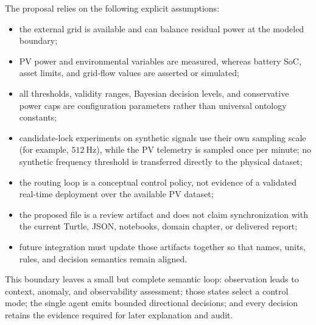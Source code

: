 \documentclass[
	letterpaper,
	10pt,
	unnumberedsections,
	twoside,
]{LTJournalArticle}
\begin{document}
The proposal relies on the following explicit assumptions:
\begin{itemize}
	\item the external grid is available and can balance residual power at the modeled boundary;
	\item PV power and environmental variables are measured, whereas battery SoC, asset limits, and grid-flow values are asserted or simulated;
	\item all thresholds, validity ranges, Bayesian decision levels, and conservative power caps are configuration parameters rather than universal ontology constants;
	\item candidate-lock experiments on synthetic signals use their own sampling scale (for example, $512\ \mathrm{Hz}$), while the PV telemetry is sampled once per minute; no synthetic frequency threshold is transferred directly to the physical dataset;
	\item the routing loop is a conceptual control policy, not evidence of a validated real-time deployment over the available PV dataset;
	\item the proposed file is a review artifact and does not claim synchronization with the current Turtle, JSON, notebooks, domain chapter, or delivered report;
	\item future integration must update those artifacts together so that names, units, rules, and decision semantics remain aligned.
\end{itemize}

This boundary leaves a small but complete semantic loop: observation leads to context, anomaly, and observability assessment; those states select a control mode; the single agent emits bounded directional decisions; and every decision retains the evidence required for later explanation and audit.
\end{document}
